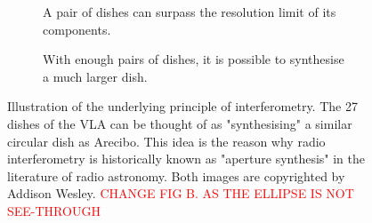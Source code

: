 \begin{figure}[ht]
\centering
\begin{subfigure}{.43\textwidth}
\caption{\label{fig.baseline.image} A pair of dishes can surpass the resolution limit of its components.}
\end{subfigure}
\hfill
\begin{subfigure}{.43\textwidth}
\caption{\label{fig.arecibo.vla} With enough pairs of dishes, it is possible to synthesise a much larger dish.}
\end{subfigure}
\caption{\label{fig.aperture.synthesis} Illustration of the underlying principle of interferometry. The 27 dishes of the VLA can be thought of as "synthesising" a similar circular dish as Arecibo. This idea is the reason why radio interferometry is historically known as "aperture synthesis" in the literature of radio astronomy. Both images are copyrighted by Addison Wesley. \textcolor{red}{CHANGE FIG B. AS THE ELLIPSE IS NOT SEE-THROUGH}}
\end{figure}

